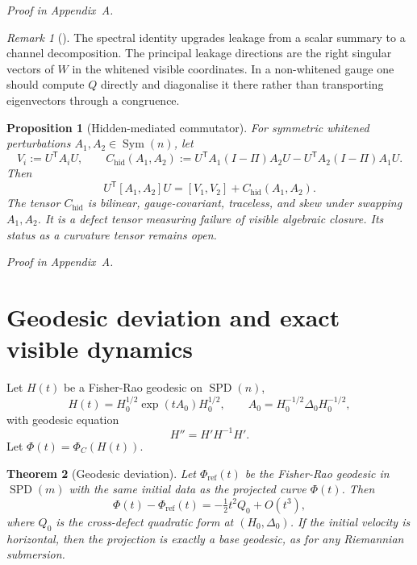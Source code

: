 \documentclass[11pt,a4paper]{article}
\numberwithin{equation}{section}
\DeclareMathOperator{\SPD}{SPD}
\DeclareMathOperator{\Sym}{Sym}
\theoremstyle{thmcompact}
\newtheorem{theorem}{Theorem}[section]
\newtheorem{proposition}[theorem]{Proposition}
\theoremstyle{remark}
\newtheorem*{remarkplain}{Remark}
\newenvironment{remark}[1][]%
{\begin{remarkbox}\begin{remarkplain}[#1]\normalfont}
{\end{remarkplain}\end{remarkbox}}
\newcommand{\proofappendix}{\par{\hfill\scriptsize\emph{Proof in Appendix~A.}}\par}
\begin{document}
\proofappendix

\begin{remark}
The spectral identity upgrades leakage from a scalar summary to a channel decomposition. The principal leakage directions are the right singular vectors of $W$ in the whitened visible coordinates. In a non-whitened gauge one should compute $Q$ directly and diagonalise it there rather than transporting eigenvectors through a congruence.
\end{remark}

\begin{proposition}[Hidden-mediated commutator]
\label{prop:hidden-commutator}
For symmetric whitened perturbations $A_1,A_2\in\Sym(n)$, let
\begin{equation}
V_i:=U^{\mathsf T}A_iU,
\qquad
C_{\mathrm{hid}}(A_1,A_2):=U^{\mathsf T}A_1(I-\Pi)A_2U-U^{\mathsf T}A_2(I-\Pi)A_1U.
\label{eq:C-hid-def}
\end{equation}
Then
\begin{equation}
U^{\mathsf T}[A_1,A_2]U=[V_1,V_2]+C_{\mathrm{hid}}(A_1,A_2).
\label{eq:commutator-decomp}
\end{equation}
The tensor $C_{\mathrm{hid}}$ is bilinear, gauge-covariant, traceless, and skew under swapping $A_1,A_2$. It is a defect tensor measuring failure of visible algebraic closure. Its status as a curvature tensor remains open.
\end{proposition}

\proofappendix

\section{Geodesic deviation and exact visible dynamics}

Let $H(t)$ be a Fisher-Rao geodesic on $\SPD(n)$,
\begin{equation}
H(t)=H_0^{1/2}\exp(tA_0)H_0^{1/2},
\qquad
A_0=H_0^{-1/2}\Delta_0 H_0^{-1/2},
\label{eq:FR-geodesic}
\end{equation}
with geodesic equation
\begin{equation}
H''=H'H^{-1}H'.
\label{eq:geodesic-equation}
\end{equation}
Let $\Phi(t)=\Phi_C(H(t))$.

\begin{theorem}[Geodesic deviation]
\label{thm:geodesic-deviation}
Let $\Phi_{\mathrm{ref}}(t)$ be the Fisher-Rao geodesic in $\SPD(m)$ with the same initial data as the projected curve $\Phi(t)$. Then
\begin{equation}
\Phi(t)-\Phi_{\mathrm{ref}}(t)=-\tfrac12 t^2 Q_0 + O(t^3),
\label{eq:geodesic-deviation}
\end{equation}
where $Q_0$ is the cross-defect quadratic form at $(H_0,\Delta_0)$. If the initial velocity is horizontal, then the projection is exactly a base geodesic, as for any Riemannian submersion.
\end{theorem}
\end{document}
